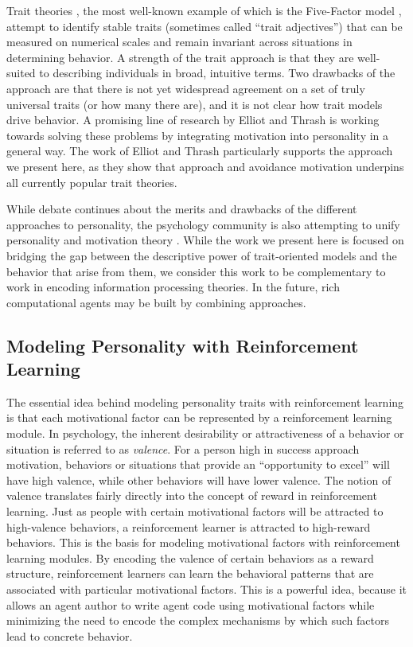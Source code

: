 Trait theories \cite{cervone2009personality}, the most well-known example of which is the Five-Factor model \cite{mccrae2008handbook}, attempt to identify stable traits (sometimes called ``trait adjectives'') that can be measured on numerical scales and remain invariant across situations in determining behavior.  A strength of the trait approach is that they are well-suited to describing individuals in broad, intuitive terms.  Two drawbacks of the approach are that there is not yet widespread agreement on a set of truly universal traits (or how many there are), and it is not clear how trait models drive behavior.  A promising line of research by Elliot and Thrash \cite{elliot2002approach-avoidance} is working towards solving these problems by integrating motivation into personality in a general way.  The work of Elliot and Thrash particularly supports the approach we present here, as they show that approach and avoidance motivation underpins all currently popular trait theories.

While debate continues about the merits and drawbacks of the different approaches to personality, the psychology community is also attempting to unify personality and motivation theory \cite{mischel2008handbook}. While the work we present here is focused on bridging the gap between the descriptive power of trait-oriented models and the behavior that arise from them, we consider this work to be complementary to work in encoding information processing theories.  In the future, rich computational agents may be built by combining approaches.

\subsection{Modeling Personality with Reinforcement Learning}

The essential idea behind modeling personality traits with reinforcement learning is that each motivational factor can be represented by a reinforcement learning module.  In psychology, the inherent desirability or attractiveness of a behavior or situation is referred to as {\em valence}.  For a person high in success approach motivation, behaviors or situations that provide an ``opportunity to excel'' will have high valence, while other behaviors will have lower valence.  The notion of valence translates fairly directly into the concept of reward in reinforcement learning.  Just as people with certain motivational factors will be attracted to high-valence behaviors, a reinforcement learner is attracted to high-reward behaviors.  This is the basis for modeling motivational factors with reinforcement learning modules.  By encoding the valence of certain behaviors as a reward structure, reinforcement learners can learn the behavioral patterns that are associated with particular motivational factors.  This is a powerful idea, because it allows an agent author to write agent code using motivational factors while minimizing the need to encode the complex mechanisms by which such factors lead to concrete behavior.

